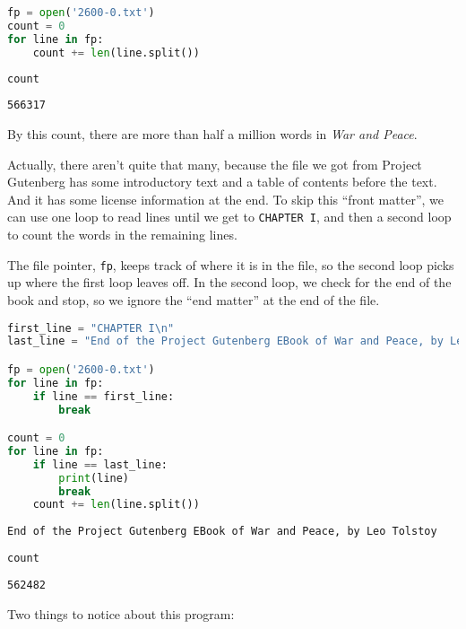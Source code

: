 \begin{lstlisting}[language=Python]
fp = open('2600-0.txt')
count = 0
for line in fp:
    count += len(line.split())
\end{lstlisting}

\begin{lstlisting}[language=Python]
count
\end{lstlisting}

\begin{lstlisting}[]
566317
\end{lstlisting}

By this count, there are more than half a million words in \emph{War and
Peace}.

Actually, there aren't quite that many, because the file we got from
Project Gutenberg has some introductory text and a table of contents
before the text. And it has some license information at the end. To skip
this ``front matter'', we can use one loop to read lines until we get to
\passthrough{\lstinline!CHAPTER I!}, and then a second loop to count the
words in the remaining lines.

The file pointer, \passthrough{\lstinline!fp!}, keeps track of where it
is in the file, so the second loop picks up where the first loop leaves
off. In the second loop, we check for the end of the book and stop, so
we ignore the ``end matter'' at the end of the file.

\begin{lstlisting}[language=Python]
first_line = "CHAPTER I\n"
last_line = "End of the Project Gutenberg EBook of War and Peace, by Leo Tolstoy\n"

fp = open('2600-0.txt')
for line in fp:
    if line == first_line:
        break

count = 0
for line in fp:
    if line == last_line:
        print(line)
        break
    count += len(line.split())
\end{lstlisting}

\begin{lstlisting}[]
End of the Project Gutenberg EBook of War and Peace, by Leo Tolstoy
\end{lstlisting}

\begin{lstlisting}[language=Python]
count
\end{lstlisting}

\begin{lstlisting}[]
562482
\end{lstlisting}

Two things to notice about this program:

